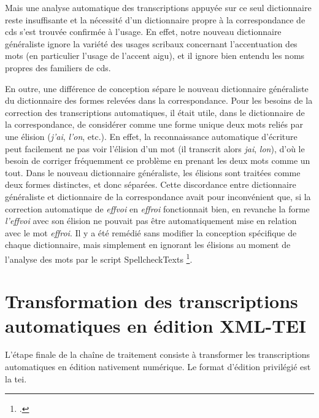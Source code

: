 \documentclass[a4paper,12pt,twoside]{book}
\begin{document}
				Mais une analyse automatique des transcriptions appuyée sur ce seul dictionnaire reste insuffisante et la nécessité d'un dictionnaire propre à la correspondance de \gls{cds} s'est trouvée confirmée à l'usage. En effet, notre nouveau dictionnaire généraliste ignore la variété des usages scribaux concernant l'accentuation des mots (en particulier l'usage de l'accent aigu), et il ignore bien entendu les noms propres des familiers de \gls{cds}. 
				
				En outre, une différence de conception sépare le nouveau dictionnaire généraliste du dictionnaire des formes relevées dans la correspondance. Pour les besoins de la correction des transcriptions automatiques, il était utile, dans le dictionnaire de la correspondance, de considérer comme une forme unique deux mots reliés par une élision (\textit{j'ai}, \textit{l'on}, etc.). En effet, la reconnaissance automatique d'écriture peut facilement ne pas voir l'élision d'un mot (il transcrit alors \textit{jai}, \textit{lon}), d'où le besoin de corriger fréquemment ce problème en prenant les deux mots comme un tout. Dans le nouveau dictionnaire généraliste, les élisions sont traitées comme deux formes distinctes, et donc séparées. Cette discordance entre dictionnaire généraliste et dictionnaire de la correspondance avait pour inconvénient que, si la correction automatique de \textit{effvoi} en \textit{effroi} fonctionnait bien, en revanche la forme \textit{l'effvoi} avec son élision ne pouvait pas être automatiquement mise en relation avec le mot \textit{effroi}. Il y a été remédié sans modifier la conception spécifique de chaque dictionnaire, mais simplement en ignorant les élisions au moment de l'analyse des mots par le script SpellcheckTexts
				\footcite{biaySpellcheckTextsPy2022}.
				
	
	\pagestyle{empty}
	\cleardoublepage
	\pagestyle{plain}			
		
	\chapter[Transformation TEI]{Transformation des transcriptions automatiques en édition XML-TEI}
		\label{chap3}
		
		L'étape finale de la chaîne de traitement consiste à transformer les transcriptions automatiques en édition nativement numérique. Le format d'édition privilégié est la \gls{tei}. 
		
\end{document}
